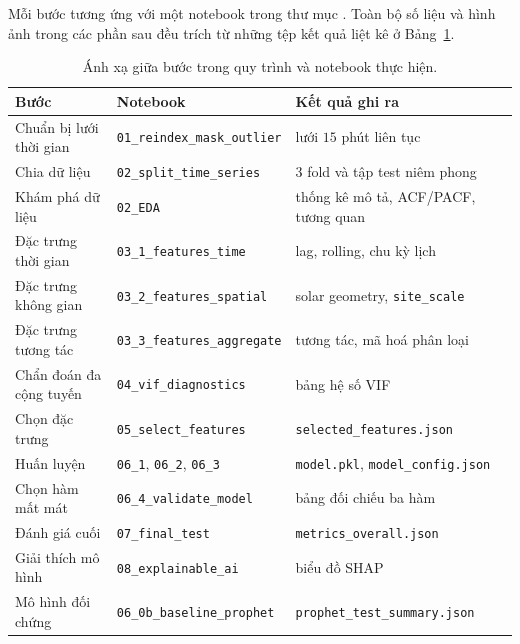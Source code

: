 Mỗi bước tương ứng với một notebook trong thư mục
. Toàn bộ số liệu và hình ảnh trong các phần
sau đều trích từ những tệp kết quả liệt kê ở Bảng~\ref{tab:notebook_pipeline}.

\begin{table}[htbp]
\centering

\footnotesize
\renewcommand{\baselinestretch}{1.0}\selectfont
\begin{tabular}{@{}p{3.4cm} p{4.6cm} p{5.4cm}@{}}
\toprule
\textbf{Bước} & \textbf{Notebook} & \textbf{Kết quả ghi ra} \\
\midrule
Chuẩn bị lưới thời gian & \texttt{01\_reindex\_mask\_outlier} & lưới $15$ phút liên tục \\
Chia dữ liệu & \texttt{02\_split\_time\_series} & $3$ fold và tập test niêm phong \\
Khám phá dữ liệu & \texttt{02\_EDA} & thống kê mô tả, ACF/PACF, tương quan \\
Đặc trưng thời gian & \texttt{03\_1\_features\_time} & lag, rolling, chu kỳ lịch \\
Đặc trưng không gian & \texttt{03\_2\_features\_spatial} & solar geometry, \texttt{site\_scale} \\
Đặc trưng tương tác & \texttt{03\_3\_features\_aggregate} & tương tác, mã hoá phân loại \\
Chẩn đoán đa cộng tuyến & \texttt{04\_vif\_diagnostics} & bảng hệ số VIF \\
Chọn đặc trưng & \texttt{05\_select\_features} & \texttt{selected\_features.json} \\
Huấn luyện & \texttt{06\_1}, \texttt{06\_2}, \texttt{06\_3} & \texttt{model.pkl}, \texttt{model\_config.json} \\
Chọn hàm mất mát & \texttt{06\_4\_validate\_model} & bảng đối chiếu ba hàm \\
Đánh giá cuối & \texttt{07\_final\_test} & \texttt{metrics\_overall.json} \\
Giải thích mô hình & \texttt{08\_explainable\_ai} & biểu đồ SHAP \\
Mô hình đối chứng & \texttt{06\_0b\_baseline\_prophet} & \texttt{prophet\_test\_summary.json} \\
\bottomrule
\end{tabular}
\caption[Ánh xạ giữa bước trong quy trình và notebook thực hiện]{Ánh xạ giữa bước trong quy trình và notebook thực hiện.}
\label{tab:notebook_pipeline}
\end{table}

